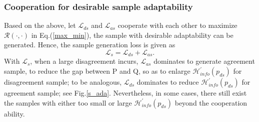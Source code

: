 \subsubsection{Cooperation for desirable sample adaptability}
Based on the above, let $\mathcal{L}_{ds}$ and $\mathcal{L}_{as}$ cooperate with each other to maximize $\mathcal{R}(\cdot,\cdot)$ in Eq.(\ref{max_min}), the sample with desirable adaptability can be generated. Hence, the sample generation loss is given as
\begin{equation}
\mathcal{L}_{s}=\mathcal{L}_{ds} + \mathcal{L}_{as}.
\label{L_G}
\end{equation}
With $\mathcal{L}_{s}$, when a large disagreement incurs, $\mathcal{L}_{as}$ dominates to generate agreement sample, to reduce the gap between P and Q, so as to enlarge $\mathcal{H}^{'}_{info}(p_{ds})$ for disagreement sample; to be analogous, $\mathcal{L}_{ds}$ dominates to reduce $\mathcal{H}^{'}_{info}(p_{ds})$ for agreement sample; see Fig.\ref{s_ada}.
Nevertheless, in some cases, there still exist the samples with either too small or large $\mathcal{H}^{'}_{info}(p_{ds})$ beyond the cooperation ability. 









